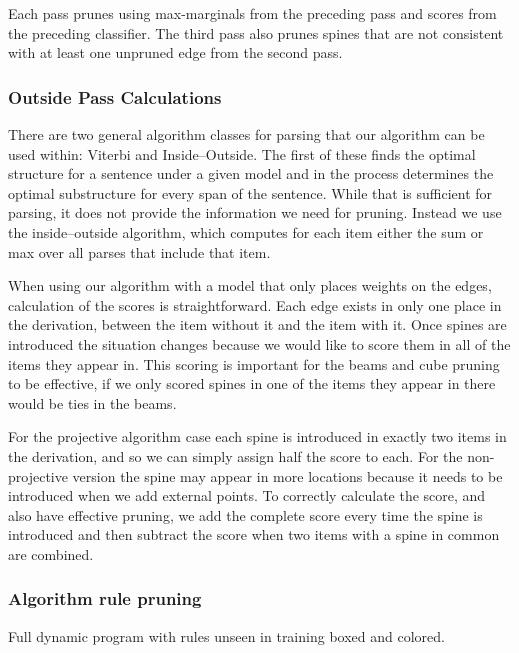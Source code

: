 Each pass prunes using max-marginals from the preceding pass and scores from the preceding classifier.
The third pass also prunes spines that are not consistent with at least one unpruned edge from the second pass.

\subsubsection{Outside Pass Calculations}

There are two general algorithm classes for parsing that our algorithm can be used within: Viterbi and Inside--Outside.
The first of these finds the optimal structure for a sentence under a given model and in the process determines the optimal substructure for every span of the sentence.
While that is sufficient for parsing, it does not provide the information we need for pruning.
Instead we use the inside--outside algorithm, which computes for each item either the sum or max over all parses that include that item.

When using our algorithm with a model that only places weights on the edges, calculation of the scores is straightforward.
Each edge exists in only one place in the derivation, between the item without it and the item with it.
Once spines are introduced the situation changes because we would like to score them in all of the items they appear in.
This scoring is important for the beams and cube pruning to be effective, if we only scored spines in one of the items they appear in there would be ties in the beams.

For the projective algorithm case each spine is introduced in exactly two items in the derivation, and so we can simply assign half the score to each.
For the non-projective version the spine may appear in more locations because it needs to be introduced when we add external points.
To correctly calculate the score, and also have effective pruning, we add the complete score every time the spine is introduced and then subtract the score when two items with a spine in common are combined.

\subsubsection{Algorithm rule pruning}

\begin{algorithm}
\vspace{-2mm}

\vspace{-10mm}
\caption{\label{fig:rules-pruned}
Full dynamic program with rules unseen in training boxed and colored.
}
\end{algorithm}

